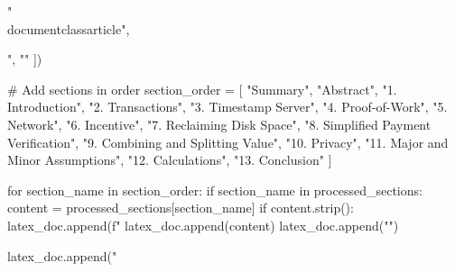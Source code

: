 "\\documentclass{article}",
\begin{document}
",
            ""
        ])
        
        # Add sections in order
        section_order = [
            "Summary", "Abstract", "1. Introduction", "2. Transactions", "3. Timestamp Server",
            "4. Proof-of-Work", "5. Network", "6. Incentive", "7. Reclaiming Disk Space",
            "8. Simplified Payment Verification", "9. Combining and Splitting Value",
            "10. Privacy", "11. Major and Minor Assumptions", "12. Calculations", "13. Conclusion"
        ]
        
        for section_name in section_order:
            if section_name in processed_sections:
                content = processed_sections[section_name]
                if content.strip():
                    latex_doc.append(f"%
                    latex_doc.append(content)
                    latex_doc.append("")
        
        latex_doc.append("\
\end{document}

